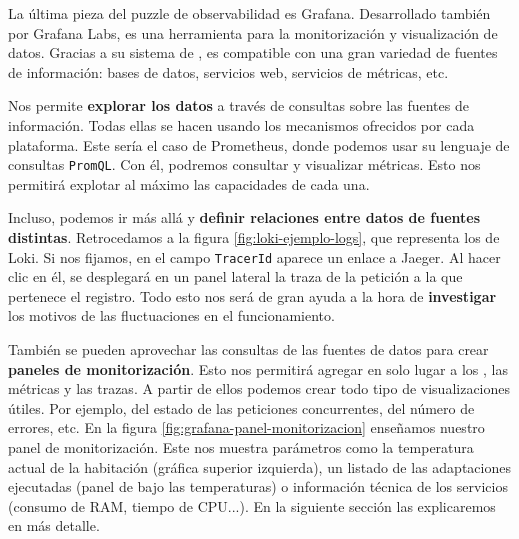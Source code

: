 La última pieza del puzzle de observabilidad es Grafana. Desarrollado también por Grafana Labs, es una herramienta para la monitorización y visualización de datos. Gracias a su sistema de , es compatible con una gran variedad de fuentes de información: bases de datos, servicios web, servicios de métricas, etc.

Nos permite \textbf{explorar los datos} a través de consultas sobre las fuentes de información. Todas ellas se hacen usando los mecanismos ofrecidos por cada plataforma. Este sería el caso de Prometheus, donde podemos usar su lenguaje de consultas \texttt{PromQL}. Con él, podremos consultar y visualizar métricas. Esto nos permitirá explotar al máximo las capacidades de cada una.

Incluso, podemos ir más allá y \textbf{definir relaciones entre datos de fuentes distintas}. Retrocedamos a la figura \ref{fig:loki-ejemplo-logs}, que representa los  de Loki. Si nos fijamos, en el campo \texttt{TracerId} aparece un enlace a Jaeger. Al hacer clic en él, se desplegará en un panel lateral la traza de la petición a la que pertenece el registro. Todo esto nos será de gran ayuda a la hora de \textbf{investigar} los motivos de las fluctuaciones en el funcionamiento.

También se pueden aprovechar las consultas de las fuentes de datos para crear \textbf{paneles de monitorización}. Esto nos permitirá agregar en solo lugar a los , las métricas y las trazas. A partir de ellos podemos crear todo tipo de visualizaciones útiles. Por ejemplo, del estado de las peticiones concurrentes, del número de errores, etc. En la figura \ref{fig:grafana-panel-monitorizacion} enseñamos nuestro panel de monitorización. Este nos muestra parámetros como la temperatura actual de la habitación (gráfica superior izquierda), un listado de las adaptaciones ejecutadas (panel de  bajo las temperaturas) o información técnica de los servicios (consumo de RAM, tiempo de CPU...). En la siguiente sección las explicaremos en más detalle.

